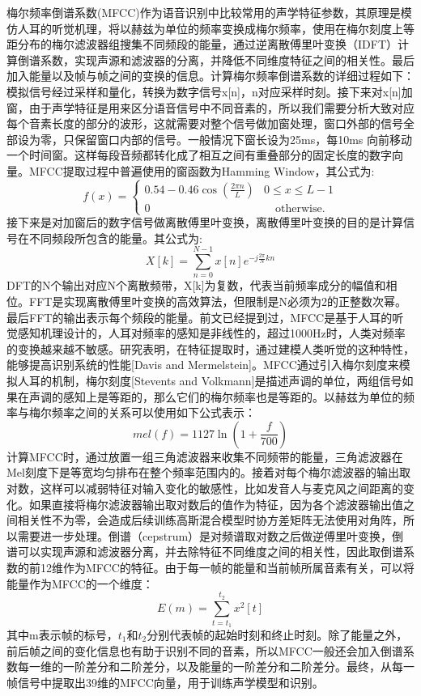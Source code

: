 梅尔频率倒谱系数(MFCC)作为语音识别中比较常用的声学特征参数，其原理是模仿人耳的听觉机理，将以赫兹为单位的频率变换成梅尔频率，使用在梅尔刻度上等距分布的梅尔滤波器组搜集不同频段的能量，通过逆离散傅里叶变换（IDFT）计算倒谱系数，实现声源和滤波器的分离，并降低不同维度特征之间的相关性。最后加入能量以及帧与帧之间的变换的信息。计算梅尔频率倒谱系数的详细过程如下：模拟信号经过采样和量化，转换为数字信号x[n]，n对应采样时刻。接下来对x[n]加窗，由于声学特征是用来区分语音信号中不同音素的，所以我们需要分析大致对应每个音素长度的部分的波形，这就需要对整个信号做加窗处理，窗口外部的信号全部设为零，只保留窗口内部的信号。一般情况下窗长设为25ms，每10ms 向前移动一个时间窗。这样每段音频都转化成了相互之间有重叠部分的固定长度的数字向量。MFCC提取过程中普遍使用的窗函数为Hamming Window，其公式为:
\begin{equation}
  f(x)=
    \begin{cases}
      0.54 - 0.46\cos(\frac{2{\pi}n}{L}) & 0\leq x\leq L-1 \\
      \text{0} &\quad\text{otherwise.} \
    \end{cases}
\end{equation}
接下来是对加窗后的数字信号做离散傅里叶变换，离散傅里叶变换的目的是计算信号在不同频段所包含的能量。其公式为:\begin{equation}X[k]=\sum_{n=0}^{N-1} x[n]{e^{-j\frac{2\pi}{N}k{n}}}\end{equation}DFT的N个输出对应N个离散频带，X[k]为复数，代表当前频率成分的幅值和相位。FFT是实现离散傅里叶变换的高效算法，但限制是N必须为2的正整数次幂。最后FFT的输出表示每个频段的能量。前文已经提到过，MFCC是基于人耳的听觉感知机理设计的，人耳对频率的感知是非线性的，超过1000Hz时，人类对频率的变换越来越不敏感。研究表明，在特征提取时，通过建模人类听觉的这种特性，能够提高识别系统的性能[Davis and Mermelstein]。MFCC通过引入梅尔刻度来模拟人耳的机制，梅尔刻度[Stevents and Volkmann]是描述声调的单位，两组信号如果在声调的感知上是等距的，那么它们的梅尔频率也是等距的。以赫兹为单位的频率与梅尔频率之间的关系可以使用如下公式表示：\begin{equation}mel(f)=1127\ln(1+\frac{f}{700})\end{equation}计算MFCC时，通过放置一组三角滤波器来收集不同频带的能量，三角滤波器在Mel刻度下是等宽均匀排布在整个频率范围内的。接着对每个梅尔滤波器的输出取对数，这样可以减弱特征对输入变化的敏感性，比如发音人与麦克风之间距离的变化。如果直接将梅尔滤波器输出取对数后的值作为特征，因为各个滤波器输出值之间相关性不为零，会造成后续训练高斯混合模型时协方差矩阵无法使用对角阵，所以需要进一步处理。倒谱（cepstrum）是对频谱取对数之后做逆傅里叶变换，倒谱可以实现声源和滤波器分离，并去除特征不同维度之间的相关性，因此取倒谱系数的前12维作为MFCC的特征。由于每一帧的能量和当前帧所属音素有关，可以将能量作为MFCC的一个维度：\begin{equation}E(m) = \sum_{t=t_1}^{t_2} x^2[t]\end{equation}
其中m表示帧的标号，$t_1$和$t_2$分别代表帧的起始时刻和终止时刻。除了能量之外，前后帧之间的变化信息也有助于识别不同的音素，所以MFCC一般还会加入倒谱系数每一维的一阶差分和二阶差分，以及能量的一阶差分和二阶差分。最终，从每一帧信号中提取出39维的MFCC向量，用于训练声学模型和识别。
